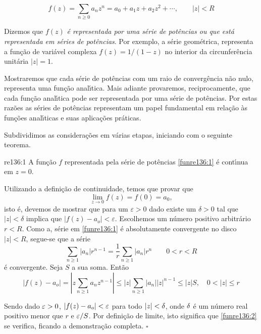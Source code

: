 \begin{equation}\label{funre136:1}
f(z)=\sum_{n\geq 0}a_nz^n=a_{0}+a_1z+a_2z^2+\cdots,\qquad |z|<R
\end{equation}

Dizemos que $f(z)$ \textit{\'{e} representada por uma s\'{e}rie de
pot\^{e}ncias ou que est\'{a} representada em s\'{e}ries de pot\^{e}ncias}. Por
exemplo, a s\'{e}rie geom\'{e}trica, representa a fun\c{c}\~{a}o de vari\'{a}vel
complexa $f(z) = 1/(1 - z)$ no interior da circunfer\^{e}ncia unit\'{a}ria
$|z| = 1$.

Mostraremos que cada s\'{e}rie de pot\^{e}ncias com um raio de
converg\^{e}ncia n\~{a}o nulo, representa uma fun\c{c}\~{a}o anal\'{\i}tica. Mais
adiante provaremos, reciprocamente, que cada fun\c{c}\~{a}o anal\'{\i}tica pode
ser representada por uma s\'{e}rie de pot\^{e}ncias. Por estas raz\~{o}es as
s\'{e}ries de pot\^{e}ncias representam um papel fundamental em rela\c{c}\~{a}o \`{a}s
fun\c{c}\~{o}es anal\'{\i}ticas e suas aplica\c{c}\~{o}es pr\'{a}ticas.

Subdividimos as considera\c{c}\~{o}es em v\'{a}rias etapas, iniciando com o
seguinte teorema.

\begin{theoc}{}{re136:1}
A fun\c{c}\~{a}o $f$ representada pela s\'{e}rie de pot\^{e}ncias
\eqref{funre136:1} \'{e} cont\'{\i}nua em $z = 0$.
\end{theoc}

\prova Utilizando a defini\c{c}\~{a}o de continuidade, temos que provar que
\begin{equation}\label{funre136:2}
  \lim_{z\to 0} f(z) = f(0) = a_{0},
\end{equation}
isto \'{e}, devemos de mostrar que para um $\varepsilon>0$ dado existe
um $\delta>0$ tal que $|z|<\delta$ implica que
$|f(z)-a_o|<\varepsilon$. Escolhemos um n\'{u}mero positivo arbitr\'{a}rio
$r<R$. Como a, s\'{e}rie em \eqref{funre136:1} \'{e} absolutamente
convergente no disco $|z| < R$, segue-se que a s\'{e}rie
\begin{equation*}
  \sum_{n\geq 1}|a_n|r^{n-1} = \frac{1}{r}\sum_{n\geq 1}|a_n|r^n\qquad 0 < r < R
\end{equation*}
\'{e} convergente. Seja $S$ a sua soma. Ent\~{a}o
\begin{equation*}
|f(z)-a_o|=\left|z\sum_{n\geq
1}a_nz^{n-1}\right|\leq|z|\sum_{n\geq 1}|a_n||z|^{n-1} \leq
|z|S,\quad 0 < |z| \le r
\end{equation*}

Sendo dado $\varepsilon> 0$, $|f(z)-a_o|<\varepsilon$ para todo $|z| < \delta$,
onde $\delta$ \'{e} um n\'{u}mero real positivo menor que $r$ e $\varepsilon/S$. Por
defini\c{c}\~{a}o de limite, isto significa que \eqref{funre136:2} se
verifica, ficando a demonstra\c{c}\~{a}o completa. \hfill $\square$

